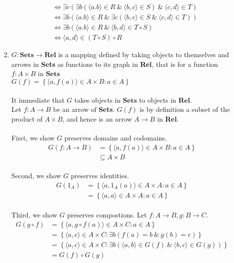 \documentclass{article} %
\newcommand{\set}[1]{\left\{#1\right\}}
\newcommand{\pair}[1]{\langle#1\rangle}
\begin{document}
\begin{enumerate}
\begin{enumerate}
\begin{align*}
            \\&\iff \exists c(\exists b(\pair{a.b}\in R \:\&\: \pair{b,c}\in S) \:\&\: \pair{c,d}\in T)
            \\&\iff \exists b(\pair{a.b}\in R \:\&\: \exists c(\pair{b,c}\in S \:\&\: \pair{c,d}\in T))
            \\&\iff \exists b(\pair{a.b}\in R \:\&\: \pair{b,d}\in T\circ S)
            \\&\iff \pair{a,d}\in (T\circ S)\circ R
        \end{align*}
        \item $G:\textbf{Sets}\rightarrow\textbf{Rel}$ is a mapping defined by taking objects to themselves and arrows in \textbf{Sets} as functions to its graph in \textbf{Rel}, that is for a function $f: A\times B$ in $\textbf{Sets}$
        \\$G(f)=\set{\pair{a,f(a)}\in A\times B:a\in A}$
        \\
        \\It immediate that $G$ takes objects in $\textbf{Sets}$ to objects in $\textbf{Rel}$.
        \\Let $f: A \rightarrow B$ be an arrow of \textbf{Sets}. $G(f)$ is by definition a subset of the product of $A \times B$, and hence is an arrow $A \rightarrow B$ in \textbf{Rel}.
        \\
        \\First, we show $G$ preserves domains and codomains.
        \begin{align*}
            G(f: A\rightarrow B)&=\set{\pair{a,f(a)}\in A\times B:a\in A}
            \\&\subseteq A\times B
        \end{align*}
        \\Second, we show $G$ preserves identities.
        \begin{align*}
            G(1_A)&=\set{\pair{a,1_A(a)}\in A\times A:a\in A}
            \\&=\set{\pair{a,a}\in A\times A:a\in A}
        \end{align*}
        \\Third, we show $G$ preserves compostions. Let $f:A\rightarrow B,g:B\rightarrow C$.
        \begin{align*}
            G(g\circ f)&=\set{\pair{a,g\circ f(a)}\in A\times C:a\in A}
            \\&=\set{\pair{a,c}\in A\times C:\exists b(f(a)=b \:\&\: g(b)=c)}
            \\&=\set{\pair{a,c}\in A\times C:\exists b(\pair{a,b}\in G(f) \:\&\: \pair{b,c}\in G(g))}
            \\&=G(f)\circ G(g)
        \end{align*}
    \end{enumerate}
\end{enumerate}
\end{document}
